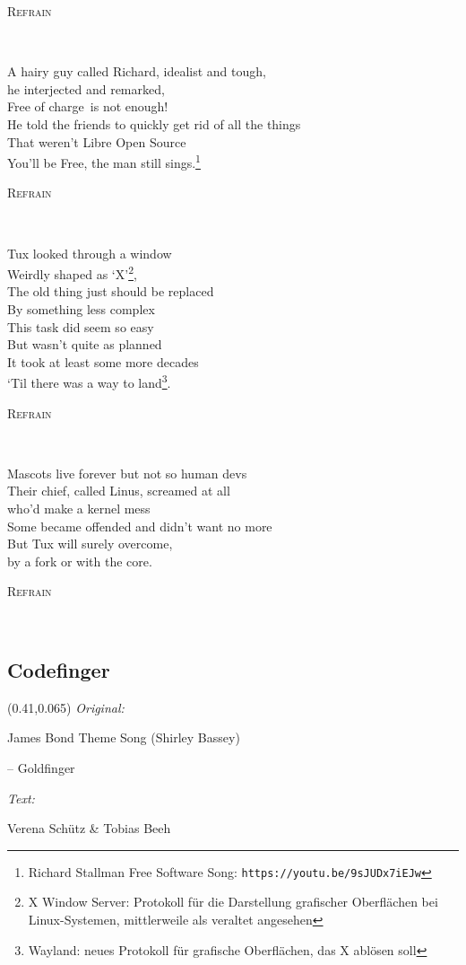 \documentclass[11pt,a5paper]{article}
\newcommand\refrain[1]{\begin{tcolorbox}#1\end{tcolorbox} \ }
\newcommand{\refrefrain}{\refrain{\textsc{Refrain}} \ }
\newcommand\songinfo[2]{\begin{textblock}{0.5}(0.41,0.065)
		\footnotesize 
		\hfill \textit{Original:} \ \ \ \ \ \ \ \ \ \ \ \ \ \ \ \ \ \ \ \ 
		
		\hfill #1
		
		\hfill  \textit{Text:} \ \ \ \ \ \ \ \ \ \ \ \ \ \ \ \ \ \ \ \ 
		
		\hfill #2
	\end{textblock}}
\begin{document}
\refrefrain

\pagebreak

A hairy guy called Richard, idealist and tough, \\
he interjected and remarked, \\
\glqq \glq Free of charge\grq \ is not enough!\grqq \\
He told the friends to quickly get rid of all the things \\
That weren't Libre Open Source \\
\glqq You'll be Free\grqq, the man still sings.\footnote{\scriptsize Richard Stallman Free Software Song: \texttt{https://youtu.be/9sJUDx7iEJw}} \\

\refrefrain

Tux looked through a window \\
Weirdly shaped as ‘X’\footnote{\scriptsize X Window Server: Protokoll für die Darstellung grafischer Oberflächen bei Linux-Systemen, mittlerweile als veraltet angesehen}, \\
The old thing just should be replaced \\ 
By something less complex \\
This task did seem so easy \\
But wasn’t quite as planned \\
It took at least some more decades \\
‘Til there was a way to land\footnote{\scriptsize Wayland: neues Protokoll für grafische Oberflächen, das X ablösen soll}. \\

\refrefrain

Mascots live forever but not so human devs \\
Their chief, called Linus, screamed at all \\
who’d make a kernel mess \\
Some became offended and didn’t want no more \\
But Tux will surely overcome, \\
by a fork or with the core. \\

\refrefrain
	
\pagebreak


\subsection{Codefinger}
\songinfo{James Bond Theme Song (Shirley Bassey)
	
	\hfill -- Goldfinger}{Verena Schütz \& Tobias Beeh}
\end{document}
